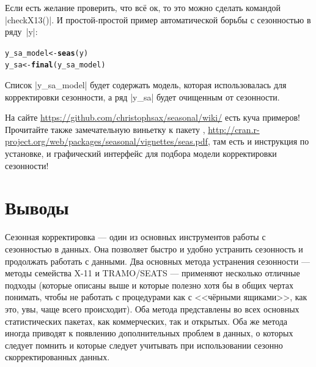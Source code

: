 \documentclass[final,pdftex]{../../template/epsilonj}\usepackage[]{graphicx}\usepackage[]{color}
\makeatletter
\newcommand{\hlstd}[1]{\textcolor[rgb]{0.345,0.345,0.345}{#1}}%
\newcommand{\hlkwb}[1]{\textcolor[rgb]{0.69,0.353,0.396}{#1}}%
\newcommand{\hlkwd}[1]{\textcolor[rgb]{0.737,0.353,0.396}{\textbf{#1}}}%
\newenvironment{kframe}{%
 \def\at@end@of@kframe{}%
 \ifinner\ifhmode%
  \def\at@end@of@kframe{\end{minipage}}%
  \begin{minipage}{\columnwidth}%
 \fi\fi%
 \def\FrameCommand##1{\hskip\@totalleftmargin \hskip-\fboxsep
 \colorbox{shadecolor}{##1}\hskip-\fboxsep
     \hskip-\linewidth \hskip-\@totalleftmargin \hskip\columnwidth}%
 \MakeFramed {\advance\hsize-\width
   \@totalleftmargin\z@ \linewidth\hsize
   \@setminipage}}%
 {\par\unskip\endMakeFramed%
 \at@end@of@kframe}
\newenvironment{knitrout}{}{} %
\makeatother
\begin{document}
Если есть желание проверить, что всё ок, то это можно сделать командой \code|checkX13()|. И простой-простой пример автоматической борьбы с сезонностью в ряду~\code|y|:
\begin{knitrout}
\color{fgcolor}\begin{kframe}
\begin{alltt}
\hlstd{y_sa_model} \hlkwb{<-} \hlkwd{seas}\hlstd{(y)}
\hlstd{y_sa} \hlkwb{<-} \hlkwd{final}\hlstd{(y_sa_model)}
\end{alltt}
\end{kframe}
\end{knitrout}

Список \code|y_sa_model| будет содержать модель, которая использовалась для корректировки сезонности, а ряд \code|y_sa| будет очищенным от сезонности.

На сайте \url{https://github.com/christophsax/seasonal/wiki/} есть куча примеров! Прочитайте также замечательную виньетку к пакету , \url{http://cran.r-project.org/web/packages/seasonal/vignettes/seas.pdf}, там есть и инструкция по установке, и графический интерфейс для подбора модели корректировки сезонности!


\section{Выводы}

Сезонная корректировка --- один из основных инструментов работы с сезонностью в данных. Она позволяет быстро и удобно устранить сезонность и продолжать работать с данными. Два основных метода устранения сезонности --- методы семейства X-11 и TRAMO/SEATS --- применяют несколько отличные подходы (которые описаны выше и которые полезно хотя бы в общих чертах понимать, чтобы не работать с процедурами как с <<чёрными ящиками>>, как это, увы, чаще всего происходит). Оба метода представлены во всех основных статистических пакетах, как коммерческих, так и открытых. Оба же метода иногда приводят к появлению дополнительных проблем в данных, о которых следует помнить и которые следует учитывать при использовании сезонно скорректированных данных.
\end{document}
